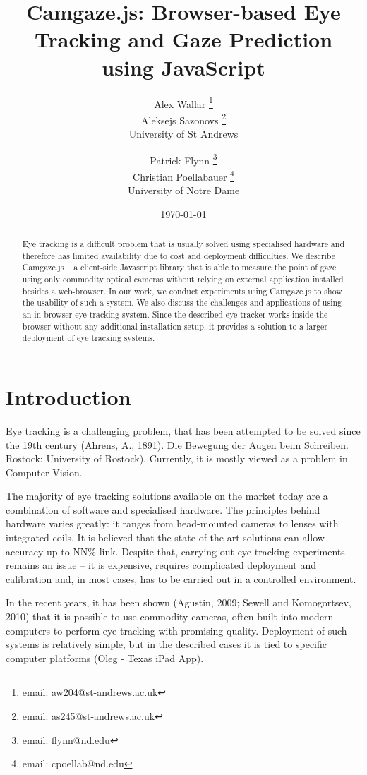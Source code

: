 \documentclass[annual]{acmsiggraph}
\title{Camgaze.js: Browser-based Eye Tracking and Gaze Prediction using
JavaScript}
\author{Alex Wallar \thanks{email: aw204@st-andrews.ac.uk} \\ Aleksejs Sazonovs
\thanks{email: as245@st-andrews.ac.uk} \\ University of St Andrews \and Patrick
Flynn \thanks{email: flynn@nd.edu} \\ Christian Poellabauer \thanks{email:
cpoellab@nd.edu} \\ University of Notre Dame}
\date{\today}
\begin{document}
\maketitle

\begin{abstract}

Eye tracking is a difficult problem that is usually solved using specialised
hardware and therefore has limited availability due to cost and deployment
difficulties. We describe Camgaze.js – a client-side Javascript library that is
able to measure the point of gaze using only commodity optical cameras without
relying on external application installed besides a web-browser. In our work,
we conduct experiments using Camgaze.js to show the usability of such a system.
We also discuss the challenges and applications of using an in-browser eye
tracking system. Since the described eye tracker works inside the browser
without any additional installation setup, it provides a solution to a larger
deployment of eye tracking systems.

\end{abstract}

\section{Introduction}

Eye tracking is a challenging problem, that has been attempted to be solved
since the 19th century (Ahrens, A., 1891). Die Bewegung der Augen beim
Schreiben. Rostock: University of Rostock). Currently, it is mostly viewed as a
problem in Computer Vision.

The majority of eye tracking solutions available on the market today are a
combination of software and specialised hardware. The principles behind
hardware varies greatly: it ranges from head-mounted cameras to lenses with
integrated coils. It is believed that the state of the art solutions can allow
accuracy up to NN\% {link}. Despite that, carrying out eye tracking experiments
remains an issue – it is expensive, requires complicated deployment and
calibration and, in most cases, has to be carried out in a controlled
environment.

In the recent years, it has been shown (Agustin, 2009; Sewell and Komogortsev,
2010) that it is possible to use commodity cameras, often built into modern
computers to perform eye tracking with promising quality. Deployment of such
systems is relatively simple, but in the described cases it is tied to specific
computer platforms (Oleg - Texas iPad App).
\end{document}
